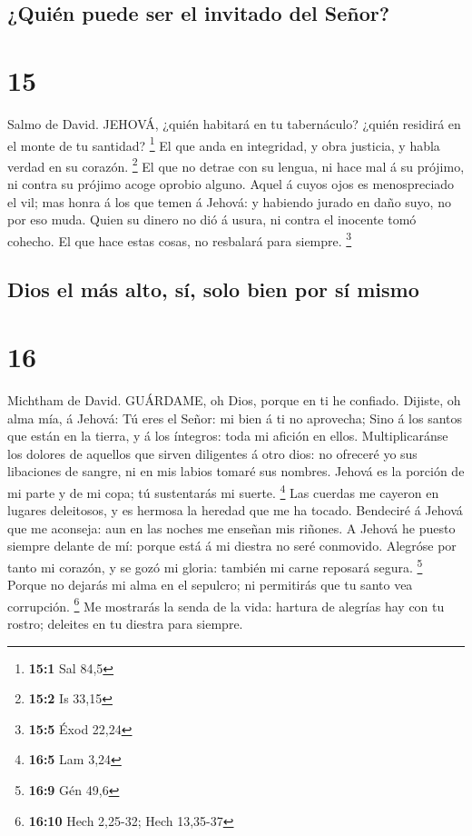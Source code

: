 \hypertarget{quiuxe9n-puede-ser-el-invitado-del-seuxf1or}{%
\subsection{¿Quién puede ser el invitado del
Señor?}\label{quiuxe9n-puede-ser-el-invitado-del-seuxf1or}}

\hypertarget{section-14}{%
\section{15}\label{section-14}}

 Salmo de David. JEHOVÁ, ¿quién habitará en tu tabernáculo?
¿quién residirá en el monte de tu santidad? \footnote{\textbf{15:1} Sal
  84,5}  El que anda en integridad, y obra justicia, y habla
verdad en su corazón. \footnote{\textbf{15:2} Is 33,15}  El
que no detrae con su lengua, ni hace mal á su prójimo, ni contra su
prójimo acoge oprobio alguno.  Aquel á cuyos ojos es
menospreciado el vil; mas honra á los que temen á Jehová: y habiendo
jurado en daño suyo, no por eso muda.  Quien su dinero no
dió á usura, ni contra el inocente tomó cohecho. El que hace estas
cosas, no resbalará para siempre. \footnote{\textbf{15:5} Éxod 22,24}

\hypertarget{dios-el-muxe1s-alto-suxed-solo-bien-por-suxed-mismo}{%
\subsection{Dios el más alto, sí, solo bien por sí
mismo}\label{dios-el-muxe1s-alto-suxed-solo-bien-por-suxed-mismo}}

\hypertarget{section-15}{%
\section{16}\label{section-15}}

 Michtham de David. GUÁRDAME, oh Dios, porque en ti he
confiado.  Dijiste, oh alma mía, á Jehová: Tú eres el Señor:
mi bien á ti no aprovecha;  Sino á los santos que están en
la tierra, y á los íntegros: toda mi afición en ellos. 
Multiplicaránse los dolores de aquellos que sirven diligentes á otro
dios: no ofreceré yo sus libaciones de sangre, ni en mis labios tomaré
sus nombres.  Jehová es la porción de mi parte y de mi copa;
tú sustentarás mi suerte. \footnote{\textbf{16:5} Lam 3,24} 
Las cuerdas me cayeron en lugares deleitosos, y es hermosa la heredad
que me ha tocado.  Bendeciré á Jehová que me aconseja: aun
en las noches me enseñan mis riñones.  A Jehová he puesto
siempre delante de mí: porque está á mi diestra no seré conmovido.
 Alegróse por tanto mi corazón, y se gozó mi gloria: también
mi carne reposará segura. \footnote{\textbf{16:9} Gén 49,6}
 Porque no dejarás mi alma en el sepulcro; ni permitirás
que tu santo vea corrupción. \footnote{\textbf{16:10} Hech 2,25-32; Hech
  13,35-37}  Me mostrarás la senda de la vida: hartura de
alegrías hay con tu rostro; deleites en tu diestra para siempre.

